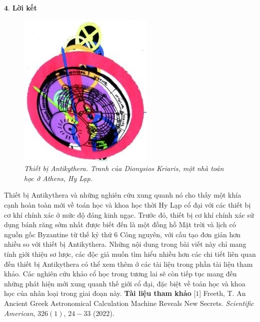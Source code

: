 \begin{multicols}{2}
	\vskip 0.1cm
	$\pmb{4.}$ \textbf{\color{lichsutoanhoc}Lời kết}
	\begin{figure}[H]
		\vspace*{-10pt}
		\centering
		\captionsetup{labelformat= empty, justification=centering}
		\includegraphics[width= 0.75\linewidth]{12}
		\caption{\small\textit{\color{lichsutoanhoc}Thiết bị Antikythera. Tranh của Dionysios Kriaris, một nhà toán học ở Athens, Hy Lạp.}}
		\vspace*{-10pt}
	\end{figure}
	Thiết bị Antikythera và những nghiên cứu xung quanh nó cho thấy một khía cạnh hoàn toàn mới về toán học và khoa học thời Hy Lạp cổ đại với các thiết bị cơ khí chính xác ở mức độ đáng kinh ngạc. Trước đó, thiết bị cơ khí chính xác sử dụng bánh răng sớm nhất được biết đến là một đồng hồ Mặt trời và lịch có nguồn gốc Byzantine từ thế kỷ thứ $6$ Công nguyên, với cấu tạo đơn giản hơn nhiều so với thiết bị Antikythera. Những nội dung trong bài viết này chỉ mang tính giới thiệu sơ lược, các độc giả muốn tìm hiểu nhiều hơn các chi tiết liên quan đến thiết bị Antikythera có thể xem thêm ở các tài liệu trong phần tài liệu tham khảo. Các nghiên cứu khảo cổ học trong tương lai sẽ còn tiếp tục mang đến những phát hiện mới xung quanh thế giới cổ đại, đặc biệt về toán học và khoa học của nhân loại trong giai đoạn này.
	\vskip 0.1cm
	\textbf{\color{lichsutoanhoc}Tài liệu tham khảo}
	\vskip 0.1cm
	[$1$] Freeth, T. An Ancient Greek Astronomical Calculation Machine Reveals New Secrets. \textit{Scientific American}, $326(1)$, $24-33$ ($2022$).

\end{multicols}
